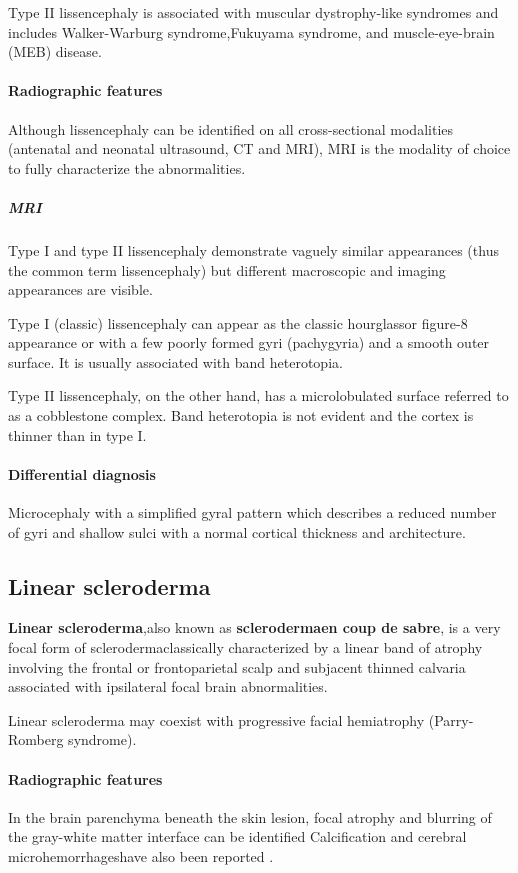 Type II lissencephaly is associated with muscular dystrophy-like syndromes and includes Walker-Warburg syndrome,Fukuyama syndrome, and muscle-eye-brain (MEB) disease.

\paragraph{Radiographic features}

Although lissencephaly can be identified on all cross-sectional modalities (antenatal and neonatal ultrasound, CT and MRI), MRI is the modality of choice to fully characterize the abnormalities.

\subparagraph{MRI}

Type I and type II lissencephaly demonstrate vaguely similar appearances (thus the common term lissencephaly) but different macroscopic and imaging appearances are visible.

Type I (classic) lissencephaly can appear as the classic hourglassor figure-8 appearance or with a few poorly formed gyri (pachygyria) and a smooth outer surface. It is usually associated with band heterotopia.

Type II lissencephaly, on the other hand, has a microlobulated surface referred to as a cobblestone complex. Band heterotopia is not evident and the cortex is thinner than in type I.

\paragraph{Differential diagnosis}

Microcephaly with a simplified gyral pattern which describes a reduced number of gyri and shallow sulci with a normal cortical thickness and architecture.

\subsection{Linear scleroderma}

\textbf{Linear scleroderma},also known as \textbf{scleroderma}\textbf{en coup de sabre}, is a very focal form of sclerodermaclassically characterized by a linear band of atrophy involving the frontal or frontoparietal scalp and subjacent thinned calvaria associated with ipsilateral focal brain abnormalities.

Linear scleroderma may coexist with progressive facial hemiatrophy (Parry-Romberg syndrome).

\paragraph{Radiographic features}

In the brain parenchyma beneath the skin lesion, focal atrophy and blurring of the gray-white matter interface can be identified Calcification and cerebral microhemorrhageshave also been reported .
